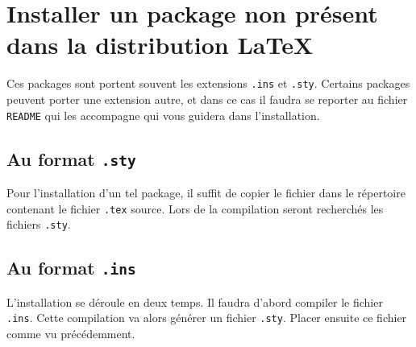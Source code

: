 \section{Installer un package non présent dans la distribution \LaTeX}
Ces packages sont portent souvent les extensions \texttt{.ins} et \texttt{.sty}. Certains packages peuvent porter une extension autre, et dans ce cas il faudra se reporter au fichier \texttt{README} qui les accompagne qui vous guidera dans l'installation.
\medskip

\subsection*{Au format \texttt{.sty}}
Pour l'installation d'un tel package, il suffit de copier le fichier dans le répertoire contenant le fichier \texttt{.tex} source. Lors de la compilation seront recherchés les fichiers \texttt{.sty}.
\medskip

\subsection*{Au format \texttt{.ins}}
L'installation se déroule en deux temps. Il faudra d'abord compiler le fichier \texttt{.ins}. Cette compilation va alors générer un fichier \texttt{.sty}. Placer ensuite ce fichier comme vu précédemment. 
\medskip
